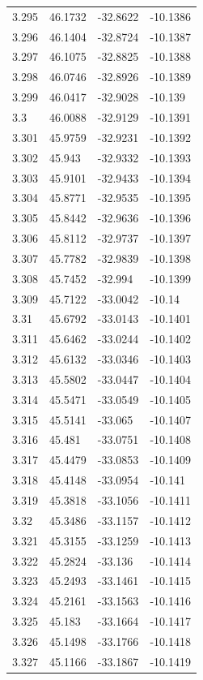 \begin{tabular}{llll}
3.295 & 46.1732 & -32.8622 & -10.1386 \\
3.296 & 46.1404 & -32.8724 & -10.1387 \\
3.297 & 46.1075 & -32.8825 & -10.1388 \\
3.298 & 46.0746 & -32.8926 & -10.1389 \\
3.299 & 46.0417 & -32.9028 & -10.139 \\
3.3 & 46.0088 & -32.9129 & -10.1391 \\
3.301 & 45.9759 & -32.9231 & -10.1392 \\
3.302 & 45.943 & -32.9332 & -10.1393 \\
3.303 & 45.9101 & -32.9433 & -10.1394 \\
3.304 & 45.8771 & -32.9535 & -10.1395 \\
3.305 & 45.8442 & -32.9636 & -10.1396 \\
3.306 & 45.8112 & -32.9737 & -10.1397 \\
3.307 & 45.7782 & -32.9839 & -10.1398 \\
3.308 & 45.7452 & -32.994 & -10.1399 \\
3.309 & 45.7122 & -33.0042 & -10.14 \\
3.31 & 45.6792 & -33.0143 & -10.1401 \\
3.311 & 45.6462 & -33.0244 & -10.1402 \\
3.312 & 45.6132 & -33.0346 & -10.1403 \\
3.313 & 45.5802 & -33.0447 & -10.1404 \\
3.314 & 45.5471 & -33.0549 & -10.1405 \\
3.315 & 45.5141 & -33.065 & -10.1407 \\
3.316 & 45.481 & -33.0751 & -10.1408 \\
3.317 & 45.4479 & -33.0853 & -10.1409 \\
3.318 & 45.4148 & -33.0954 & -10.141 \\
3.319 & 45.3818 & -33.1056 & -10.1411 \\
3.32 & 45.3486 & -33.1157 & -10.1412 \\
3.321 & 45.3155 & -33.1259 & -10.1413 \\
3.322 & 45.2824 & -33.136 & -10.1414 \\
3.323 & 45.2493 & -33.1461 & -10.1415 \\
3.324 & 45.2161 & -33.1563 & -10.1416 \\
3.325 & 45.183 & -33.1664 & -10.1417 \\
3.326 & 45.1498 & -33.1766 & -10.1418 \\
3.327 & 45.1166 & -33.1867 & -10.1419 \\

\end{tabular}
